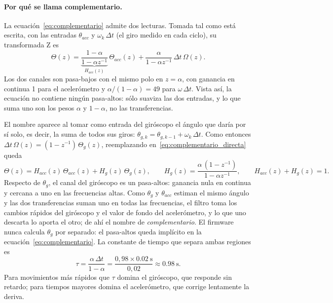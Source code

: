 \paragraph{Por qué se llama complementario.} La ecuación~\eqref{eq:complementario} admite dos lecturas. Tomada tal como está escrita, con las entradas $\theta_{acc}$ y $\omega_k\,\Delta t$ (el giro medido en cada ciclo), su transformada Z es
\begin{equation}
\Theta(z) = \underbrace{\frac{1-\alpha}{1-\alpha z^{-1}}}_{H_{acc}(z)}\,\Theta_{acc}(z) + \frac{\alpha}{1-\alpha z^{-1}}\,\Delta t\,\Omega(z).
\label{eq:complementario_directa}
\end{equation}
Los dos canales son pasa-bajos con el mismo polo en $z = \alpha$, con ganancia en continua 1 para el acelerómetro y $\alpha/(1-\alpha) = 49$ para $\omega\,\Delta t$. Vista así, la ecuación no contiene ningún pasa-altos: sólo suaviza las dos entradas, y lo que suma uno son los pesos $\alpha$ y $1-\alpha$, no las transferencias.

El nombre aparece al tomar como entrada del giróscopo el ángulo que daría por sí solo, es decir, la suma de todos sus giros: $\theta_{g,k} = \theta_{g,k-1} + \omega_k\,\Delta t$. Como entonces $\Delta t\,\Omega(z) = (1-z^{-1})\,\Theta_g(z)$, reemplazando en~\eqref{eq:complementario_directa} queda
\begin{equation}
\Theta(z) = H_{acc}(z)\,\Theta_{acc}(z) + H_g(z)\,\Theta_g(z), \qquad
H_g(z) = \frac{\alpha\,(1-z^{-1})}{1-\alpha z^{-1}}, \qquad
H_{acc}(z) + H_g(z) = 1 .
\end{equation}
Respecto de $\theta_g$, el canal del giróscopo es un pasa-altos: ganancia nula en continua y cercana a uno en las frecuencias altas. Como $\theta_g$ y $\theta_{acc}$ estiman el mismo ángulo y las dos transferencias suman uno en todas las frecuencias, el filtro toma los cambios rápidos del giróscopo y el valor de fondo del acelerómetro, y lo que uno descarta lo aporta el otro; de ahí el nombre de \emph{complementario}. El firmware nunca calcula $\theta_g$ por separado: el pasa-altos queda implícito en la ecuación~\eqref{eq:complementario}. La constante de tiempo que separa ambas regiones es
\begin{equation}
\tau = \frac{\alpha\,\Delta t}{1-\alpha} = \frac{0{,}98 \times \SI{0.02}{\second}}{0{,}02} \approx \SI{0.98}{\second}.
\end{equation}
Para movimientos más rápidos que $\tau$ domina el giróscopo, que responde sin retardo; para tiempos mayores domina el acelerómetro, que corrige lentamente la deriva.


